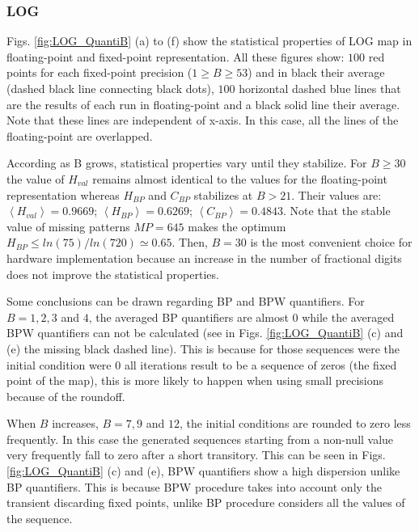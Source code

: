 \subsubsection{LOG} \label{subsubsec:log}

Figs. \ref{fig:LOG_QuantiB} (a) to (f) show the statistical properties of LOG map in floating-point and fixed-point representation.
All these figures show: $100$ red points for each fixed-point precision ($1\geq B \geq 53$) and in black their average (dashed black line connecting black dots), $100$ horizontal dashed blue lines that are the results of each run in floating-point and a black solid line their average.
Note that these lines are independent of x-axis.
In this case, all the lines of the floating-point are overlapped.

According as B grows, statistical properties vary until they stabilize.
For $B\geq 30$ the value of $H_{val}$ remains almost identical to the values for the floating-point representation whereas $H_{BP}$ and $C_{BP}$ stabilizes at $B>21$.
Their values are: $\left\langle H_{val}\right\rangle =0.9669$; $\left\langle H_{BP}\right\rangle =0.6269$; $\left\langle C_{BP}\right\rangle=0.4843$.
Note that the stable value of missing patterns $MP=645$ makes the optimum $H_{BP} \leq ln(75)/ln(720) \simeq 0.65$.
Then, $B=30$ is the most convenient choice for hardware implementation because an increase in the number of fractional digits does not improve the statistical properties.

Some conclusions can be drawn regarding BP and BPW quantifiers.
For $B=1, 2, 3$ and $4$, the averaged BP quantifiers are almost $0$ while the averaged BPW quantifiers can not be calculated (see in Figs. \ref{fig:LOG_QuantiB} (c) and (e) the missing black dashed line).
This is because for those sequences were the initial condition were $0$ all iterations result to be a sequence of zeros (the fixed point of the map), this is more likely to happen when using small precisions because of the roundoff.

When $B$ increases, $B=7, 9$ and $12$, the initial conditions are rounded to zero less frequently.
In this case the generated sequences starting from a non-null value very frequently fall to zero after a short transitory.
This can be seen in Figs.\ref{fig:LOG_QuantiB} (c) and (e), BPW quantifiers show a high dispersion unlike BP quantifiers.
This is because BPW procedure takes into account only the transient discarding fixed points, unlike BP procedure considers all the values of the sequence. 

